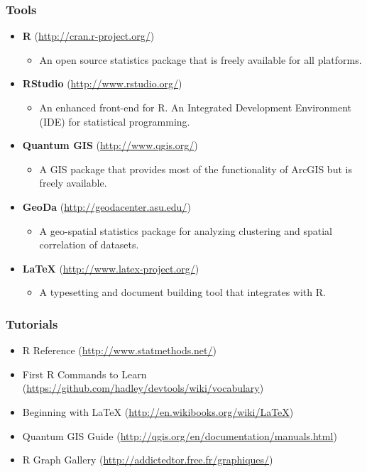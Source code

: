 \documentclass{beamer}
\begin{document}
\begin{frame}
\frametitle{Tools}

\begin{itemize}
  \item \textbf{R} (\href{http://cran.r-project.org/}{http://cran.r-project.org/})
    \begin{itemize}
    \item An open source statistics package that is freely available for all platforms.
    \end{itemize}
  \item \textbf{RStudio} (\href{http://www.rstudio.org/}{http://www.rstudio.org/})
    \begin{itemize}
    \item An enhanced front-end for R. An Integrated Development Environment (\textsc{IDE}) for statistical programming.
    \end{itemize}
  \item \textbf{Quantum GIS} (\href{http://www.qgis.org/}{http://www.qgis.org/})
    \begin{itemize}
    \item A GIS package that provides most of the functionality of ArcGIS but is freely available.
    \end{itemize}
  \item \textbf{GeoDa} (\href{http://geodacenter.asu.edu/}{http://geodacenter.asu.edu/})
    \begin{itemize}
    \item A geo-spatial statistics package for analyzing clustering and spatial correlation of datasets.
    \end{itemize}
  \item \textbf{\LaTeX{}} (\href{http://www.latex-project.org/}{http://www.latex-project.org/})
    \begin{itemize}
    \item A typesetting and document building tool that integrates with R.
    \end{itemize}
  \end{itemize}
\end{frame}

\begin{frame}
\frametitle{Tutorials}
\begin{itemize}
  \item R Reference (\href{http://www.statmethods.net/}{http://www.statmethods.net/})
  \item First R Commands to Learn (\href{https://github.com/hadley/devtools/wiki/vocabulary}{https://github.com/hadley/devtools/wiki/vocabulary})
  \item Beginning with \LaTeX{} (\href{http://en.wikibooks.org/wiki/LaTeX}{http://en.wikibooks.org/wiki/LaTeX})
  \item Quantum GIS Guide (\href{http://qgis.org/en/documentation/manuals.html}{http://qgis.org/en/documentation/manuals.html})
  \item R Graph Gallery (\href{http://addictedtor.free.fr/graphiques/}{http://addictedtor.free.fr/graphiques/})
\end{itemize}
\end{frame}
\end{document}
